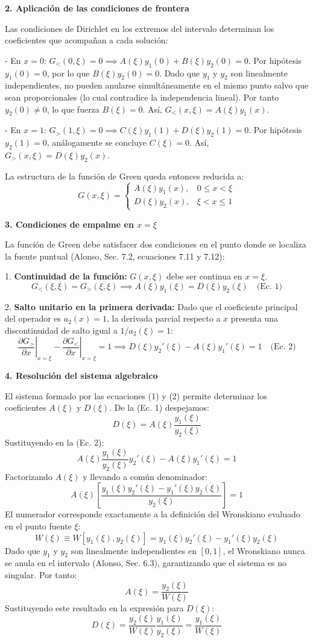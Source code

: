 \documentclass[a4paper]{article}
\begin{document}
\textbf{2. Aplicación de las condiciones de frontera}

Las condiciones de Dirichlet en los extremos del intervalo determinan los coeficientes que acompañan a cada solución:

- En $x = 0$: $G_<(0, \xi) = 0 \implies A(\xi) y_1(0) + B(\xi) y_2(0) = 0$. Por hipótesis $y_1(0) = 0$, por lo que $B(\xi) y_2(0) = 0$. Dado que $y_1$ y $y_2$ son linealmente independientes, no pueden anularse simultáneamente en el mismo punto salvo que sean proporcionales (lo cual contradice la independencia lineal). Por tanto $y_2(0) \neq 0$, lo que fuerza $B(\xi) = 0$. Así, $G_<(x, \xi) = A(\xi) y_1(x)$.

- En $x = 1$: $G_>(1, \xi) = 0 \implies C(\xi) y_1(1) + D(\xi) y_2(1) = 0$. Por hipótesis $y_2(1) = 0$, análogamente se concluye $C(\xi) = 0$. Así, $G_>(x, \xi) = D(\xi) y_2(x)$.

La estructura de la función de Green queda entonces reducida a:
$$ G(x, \xi) = \begin{cases} A(\xi) y_1(x), & 0 \le x < \xi \\ D(\xi) y_2(x), & \xi < x \le 1 \end{cases} $$

\textbf{3. Condiciones de empalme en $x = \xi$}

La función de Green debe satisfacer dos condiciones en el punto donde se localiza la fuente puntual (Alonso, Sec. 7.2, ecuaciones 7.11 y 7.12):

1. \textbf{Continuidad de la función:} $G(x, \xi)$ debe ser continua en $x = \xi$.
$$ G_<(\xi, \xi) = G_>(\xi, \xi) \implies A(\xi) y_1(\xi) = D(\xi) y_2(\xi) \quad \text{(Ec. 1)} $$

2. \textbf{Salto unitario en la primera derivada:} Dado que el coeficiente principal del operador es $a_2(x) = 1$, la derivada parcial respecto a $x$ presenta una discontinuidad de salto igual a $1/a_2(\xi) = 1$:
$$ \left. \frac{\partial G_>}{\partial x} \right|_{x=\xi} - \left. \frac{\partial G_<}{\partial x} \right|_{x=\xi} = 1 \implies D(\xi) y_2'(\xi) - A(\xi) y_1'(\xi) = 1 \quad \text{(Ec. 2)} $$

\textbf{4. Resolución del sistema algebraico}

El sistema formado por las ecuaciones (1) y (2) permite determinar los coeficientes $A(\xi)$ y $D(\xi)$. De la (Ec. 1) despejamos:
$$ D(\xi) = A(\xi) \frac{y_1(\xi)}{y_2(\xi)} $$
Sustituyendo en la (Ec. 2):
$$ A(\xi) \frac{y_1(\xi)}{y_2(\xi)} y_2'(\xi) - A(\xi) y_1'(\xi) = 1 $$
Factorizando $A(\xi)$ y llevando a común denominador:
$$ A(\xi) \left[ \frac{y_1(\xi) y_2'(\xi) - y_1'(\xi) y_2(\xi)}{y_2(\xi)} \right] = 1 $$
El numerador corresponde exactamente a la definición del Wronskiano evaluado en el punto fuente $\xi$:
$$ W(\xi) \equiv W[y_1(\xi), y_2(\xi)] = y_1(\xi) y_2'(\xi) - y_1'(\xi) y_2(\xi) $$
Dado que $y_1$ y $y_2$ son linealmente independientes en $[0, 1]$, el Wronskiano nunca se anula en el intervalo (Alonso, Sec. 6.3), garantizando que el sistema es no singular. Por tanto:
$$ A(\xi) = \frac{y_2(\xi)}{W(\xi)} $$
Sustituyendo este resultado en la expresión para $D(\xi)$:
$$ D(\xi) = \frac{y_2(\xi)}{W(\xi)} \frac{y_1(\xi)}{y_2(\xi)} = \frac{y_1(\xi)}{W(\xi)} $$
\end{document}
